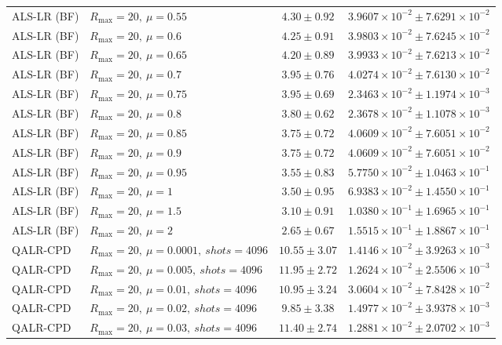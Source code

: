 \begin{table}[t]
\begin{tabular}{@{}llcc@{}}
ALS-LR (BF) & \(R_{\max}=20,\ \mu=0.55\) & \(4.30 \pm 0.92\) & \(3.9607{\times}10^{-2} \pm 7.6291{\times}10^{-2}\) \\
ALS-LR (BF) & \(R_{\max}=20,\ \mu=0.6\) & \(4.25 \pm 0.91\) & \(3.9803{\times}10^{-2} \pm 7.6245{\times}10^{-2}\) \\
ALS-LR (BF) & \(R_{\max}=20,\ \mu=0.65\) & \(4.20 \pm 0.89\) & \(3.9933{\times}10^{-2} \pm 7.6213{\times}10^{-2}\) \\
ALS-LR (BF) & \(R_{\max}=20,\ \mu=0.7\) & \(3.95 \pm 0.76\) & \(4.0274{\times}10^{-2} \pm 7.6130{\times}10^{-2}\) \\
ALS-LR (BF) & \(R_{\max}=20,\ \mu=0.75\) & \(3.95 \pm 0.69\) & \(2.3463{\times}10^{-2} \pm 1.1974{\times}10^{-3}\) \\
ALS-LR (BF) & \(R_{\max}=20,\ \mu=0.8\) & \(3.80 \pm 0.62\) & \(2.3678{\times}10^{-2} \pm 1.1078{\times}10^{-3}\) \\
ALS-LR (BF) & \(R_{\max}=20,\ \mu=0.85\) & \(3.75 \pm 0.72\) & \(4.0609{\times}10^{-2} \pm 7.6051{\times}10^{-2}\) \\
ALS-LR (BF) & \(R_{\max}=20,\ \mu=0.9\) & \(3.75 \pm 0.72\) & \(4.0609{\times}10^{-2} \pm 7.6051{\times}10^{-2}\) \\
ALS-LR (BF) & \(R_{\max}=20,\ \mu=0.95\) & \(3.55 \pm 0.83\) & \(5.7750{\times}10^{-2} \pm 1.0463{\times}10^{-1}\) \\
ALS-LR (BF) & \(R_{\max}=20,\ \mu=1\) & \(3.50 \pm 0.95\) & \(6.9383{\times}10^{-2} \pm 1.4550{\times}10^{-1}\) \\
ALS-LR (BF) & \(R_{\max}=20,\ \mu=1.5\) & \(3.10 \pm 0.91\) & \(1.0380{\times}10^{-1} \pm 1.6965{\times}10^{-1}\) \\
ALS-LR (BF) & \(R_{\max}=20,\ \mu=2\) & \(2.65 \pm 0.67\) & \(1.5515{\times}10^{-1} \pm 1.8867{\times}10^{-1}\) \\
QALR-CPD & \(R_{\max}=20,\ \mu=0.0001,\ shots=4096\) & \(10.55 \pm 3.07\) & \(1.4146{\times}10^{-2} \pm 3.9263{\times}10^{-3}\) \\
QALR-CPD & \(R_{\max}=20,\ \mu=0.005,\ shots=4096\) & \(11.95 \pm 2.72\) & \(1.2624{\times}10^{-2} \pm 2.5506{\times}10^{-3}\) \\
QALR-CPD & \(R_{\max}=20,\ \mu=0.01,\ shots=4096\) & \(10.95 \pm 3.24\) & \(3.0604{\times}10^{-2} \pm 7.8428{\times}10^{-2}\) \\
QALR-CPD & \(R_{\max}=20,\ \mu=0.02,\ shots=4096\) & \(9.85 \pm 3.38\) & \(1.4977{\times}10^{-2} \pm 3.9378{\times}10^{-3}\) \\
QALR-CPD & \(R_{\max}=20,\ \mu=0.03,\ shots=4096\) & \(11.40 \pm 2.74\) & \(1.2881{\times}10^{-2} \pm 2.0702{\times}10^{-3}\) \\

\end{tabular}
\end{table}
